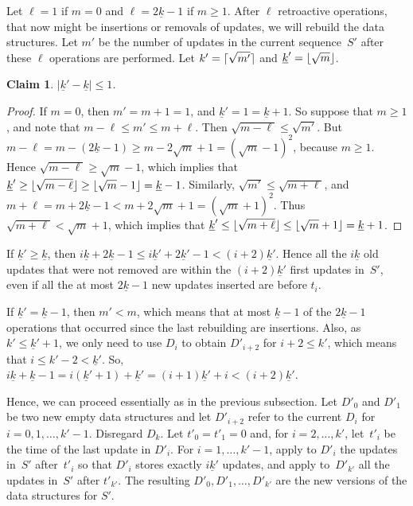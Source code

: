\documentclass[reqno,11pt]{amsart}
\DeclarePairedDelimiter\ceil{\lceil}{\rceil}
\DeclarePairedDelimiter\floor{\lfloor}{\rfloor}
\newtheorem{claim}	[theorem] {Claim}
\begin{document}
Let $\ell=1$ if $m = 0$ and $\ell=2\underline{k}-1$ if $m \geq 1$. 
After $\ell$ retroactive operations, that now might be insertions 
or removals of updates, we will rebuild the data structures.
Let $m'$ be the number of updates in the current sequence~$S'$ 
after these $\ell$ operations are performed. 
Let $k'= \ceil{\sqrt{m'}}$ and $\underline{k}' = \floor{\sqrt{m}}$. 

\begin{claim}
  $|\underline{k}' - \underline{k}| \leq 1$.
\end{claim}
\begin{proof}
  If $m = 0$, then $m' = m + 1 = 1$, and $\underline{k}' = 1 = \underline{k}+1$.
  So suppose that $m \geq 1$, and note that $m-\ell \leq m' \leq m+\ell$.  
  Then $\sqrt{m-\ell} \leq \sqrt{m'}$.  
  But $m-\ell = m - (2\underline{k}-1) \geq m - 2\sqrt{m} + 1 = (\sqrt{m}-1)^2$, 
  because $m \geq 1$. 
  Hence $\sqrt{m-\ell} \geq \sqrt{m}-1$, 
  which implies that 
  $\underline{k}' \geq \floor{\sqrt{m-\ell}} \geq \floor{\sqrt{m}-1} = \underline{k}-1$. 
  Similarly, $\sqrt{m'} \leq \sqrt{m+\ell}$, and
  $m+\ell = m + 2\underline{k}-1 < m + 2\sqrt{m} + 1 = (\sqrt{m}+1)^2$. 
  Thus $\sqrt{m+\ell} < \sqrt{m}+1$, 
  which implies that 
  $\underline{k}' \leq \floor{\sqrt{m+\ell}} \leq \floor{\sqrt{m}+1} = \underline{k}+1$. 
\end{proof}

If $\underline{k}' \geq \underline{k}$, then
$i\underline{k}+2\underline{k}-1 \leq i\underline{k}'+2\underline{k}'-1 < (i+2)\underline{k}'$.
Hence all the $i\underline{k}$ old updates that were not removed 
are within the $(i+2)\underline{k}'$ first updates in~$S'$, 
even if all the at most $2\underline{k}-1$ new updates inserted are before $t_i$. 

If $\underline{k}' = \underline{k}-1$, then $m'<m$, 
which means that at most $\underline{k}-1$ of the $2\underline{k}-1$ 
operations that occurred since the last rebuilding are insertions. 
Also, as $k' \leq \underline{k}'+1$, 
we only need to use $D_i$ to obtain $D'_{i+2}$ for $i+2 \leq k'$, 
which means that $i \leq k'-2 < \underline{k}'$.  
So, $i\underline{k}+\underline{k}-1 = i(\underline{k}'+1)+\underline{k}' 
= (i+1)\underline{k}'+i <  (i+2)\underline{k}'$. 

Hence, we can proceed essentially as in the previous subsection.
Let $D'_0$ and $D'_1$ be two new empty data structures 
and let $D'_{i+2}$ refer to the current $D_i$ for~$i=0,1,\ldots,k'-1$.  Disregard $D_k$.   
Let $t'_0 = t'_1 = 0$ and, for $i=2,\ldots,k'$, 
let~$t'_i$ be the time of the last update in $D'_i$.
For $i=1,\ldots,k'-1$, apply to $D'_i$ the updates in~$S'$ 
after~$t'_i$ so that $D'_i$ stores exactly $i\underline{k}'$ updates, 
and apply to~$D'_{k'}$ all the updates in~$S'$ after $t'_{k'}$. 
The resulting $D'_0,D'_1,\ldots,D'_{k'}$ are the new versions of the data structures for $S'$. 
\end{document}
